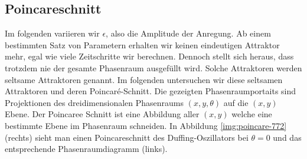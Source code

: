 \documentclass[12pt,a4paper]{article}
\begin{document}
\subsection{ Poincareschnitt }
Im folgenden variieren wir $\epsilon$, also die Amplitude der Anregung.
Ab einem bestimmten Satz von Parametern erhalten wir keinen eindeutigen Attraktor mehr, egal wie viele Zeitschritte wir berechnen. Dennoch stellt sich heraus, dass trotzdem nie der gesamte Phasenraum ausgefüllt wird. Solche Attraktoren werden seltsame Attraktoren genannt. Im folgenden untersuchen wir diese seltsamen Attraktoren und deren Poincaré-Schnitt. 
Die gezeigten Phasenraumportaits sind Projektionen des dreidimensionalen Phasenraums $(x,y,\theta)$ auf die $(x,y)$ Ebene. Der Poincaree Schnitt ist eine Abbildung aller $(x,y)$ welche eine bestimmte Ebene im Phasenraum schneiden. In Abbildung \ref{img:poincare-772} (rechts) sieht man einen Poincareschnitt des Duffing-Oszillators bei $\theta=0$ und das entsprechende Phasenraumdiagramm (links).
\end{document}

